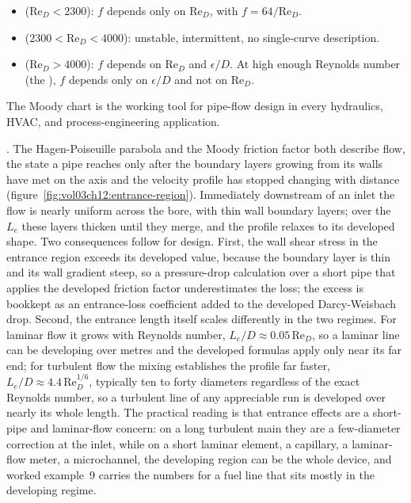 

\begin{itemize}[leftmargin=*]
  \item {} ($\text{Re}_D < 2300$): $f$
    depends only on $\text{Re}_D$, with $f = 64/\text{Re}_D$.
  \item {} ($2300 < \text{Re}_D <
    4000$): unstable, intermittent, no single-curve description.
  \item {} ($\text{Re}_D > 4000$): $f$
    depends on $\text{Re}_D$ and $\epsilon/D$. At high enough
    Reynolds number (the ), $f$
    depends only on $\epsilon/D$ and not on $\text{Re}_D$.
\end{itemize}

The Moody chart is the working tool for pipe-flow design in every
hydraulics, HVAC, and process-engineering application.

. The
Hagen-Poiseuille parabola and the Moody friction factor both describe
 flow, the state a pipe reaches only after the
boundary layers growing from its walls have met on the axis and the
velocity profile has stopped changing with distance
(figure~\ref{fig:vol03ch12:entrance-region}). Immediately
downstream of an inlet the flow is nearly uniform across the bore, with
thin wall boundary layers; over the  $L_e$
these layers thicken until they merge, and the profile relaxes to its
developed shape. Two consequences follow for design. First, the wall
shear stress in the entrance region exceeds its developed value,
because the boundary layer is thin and its wall gradient steep, so a
pressure-drop calculation over a short pipe that applies the developed
friction factor underestimates the loss; the excess is bookkept as an
entrance-loss coefficient added to the developed Darcy-Weisbach drop.
Second, the entrance length itself scales differently in the two
regimes. For laminar flow it grows with Reynolds number,
$L_e/D \approx 0.05\,\text{Re}_D$, so a laminar line can be developing
over metres and the developed formulas apply only near its far end; for
turbulent flow the mixing establishes the profile far faster,
$L_e/D \approx 4.4\,\text{Re}_D^{1/6}$, typically ten to forty
diameters regardless of the exact Reynolds number, so a turbulent line
of any appreciable run is developed over nearly its whole length. The
practical reading is that entrance effects are a short-pipe and
laminar-flow concern: on a long turbulent main they are a few-diameter
correction at the inlet, while on a short laminar element, a
capillary, a laminar-flow meter, a microchannel, the developing region
can be the whole device, and worked example~9 carries the numbers for
a fuel line that sits mostly in the developing regime.

